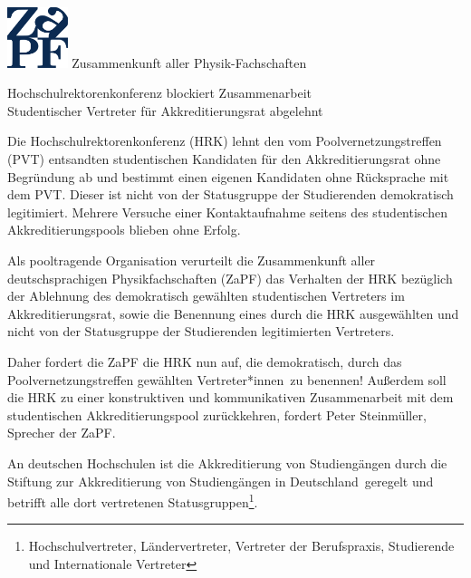 \documentclass[DIV=calc]{scrartcl}
\newcommand{\gen}{*innen}
\begin{document}
    \hspace{0.87\textwidth}
    \begin{minipage}{120pt}
        \vspace{-1.8cm}
        \includegraphics[width=50pt]{logo.pdf}
        \centering
        \small Zusammenkunft aller Physik-Fachschaften
    \end{minipage}
    \begin{center}
        \Huge{Hochschulrektorenkonferenz blockiert Zusammenarbeit}\\
        \large{Studentischer Vertreter für Akkreditierungsrat abgelehnt}
        \normalsize
    \end{center}
Die Hochschulrektorenkonferenz (HRK) lehnt den vom Poolvernetzungstreffen (PVT) entsandten studentischen Kandidaten für den Akkreditierungsrat ohne Begründung ab und bestimmt einen eigenen Kandidaten ohne Rücksprache mit dem PVT. Dieser ist nicht von der Statusgruppe der Studierenden demokratisch legitimiert. Mehrere Versuche einer Kontaktaufnahme seitens des studentischen Akkreditierungspools blieben ohne Erfolg.

Als pooltragende Organisation verurteilt die Zusammenkunft aller deutschsprachigen Physikfachschaften (ZaPF) das Verhalten der HRK bezüglich der Ablehnung des demokratisch gewählten studentischen Vertreters im Akkreditierungsrat, sowie die Benennung eines durch die HRK ausgewählten und nicht von der Statusgruppe der Studierenden legitimierten Vertreters. 

Daher fordert die ZaPF die HRK nun auf, die demokratisch, durch das Poolvernetzungstreffen gewählten Vertreter\gen\ zu benennen! \glqq Außerdem soll die HRK zu einer konstruktiven und kommunikativen Zusammenarbeit mit dem studentischen Akkreditierungspool zurückkehren\grqq , fordert Peter Steinmüller, Sprecher der ZaPF.

An deutschen Hochschulen ist die Akkreditierung von Studiengängen durch die \glqq Stiftung zur Akkreditierung von Studiengängen in Deutschland\grqq\ geregelt und betrifft alle dort vertretenen Statusgruppen\footnote{Hochschulvertreter, Ländervertreter, Vertreter der Berufspraxis, Studierende und Internationale Vertreter}.
\end{document}
